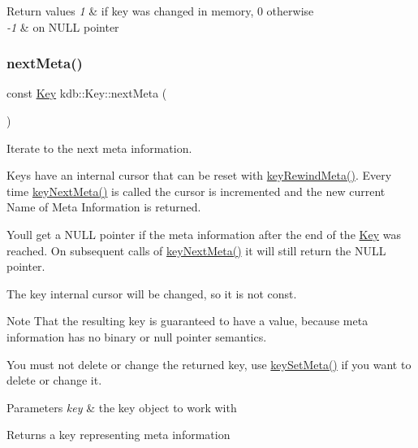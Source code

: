 \begin{DoxyRetVals}{Return values}
{\em 1} & if {\ttfamily key} was changed in memory, 0 otherwise \\
\hline
{\em -\/1} & on N\+U\+LL pointer \\
\hline
\end{DoxyRetVals}
\mbox{\label{classkdb_1_1Key_a855f37fef58a4ea4006d9e281f66cfe1}} 
\subsubsection{\texorpdfstring{nextMeta()}{nextMeta()}}
{\footnotesize\ttfamily const \mbox{\hyperlink{classkdb_1_1Key}{Key}} kdb\+::\+Key\+::next\+Meta (\begin{DoxyParamCaption}{ }\end{DoxyParamCaption})\hspace{0.3cm}{\ttfamily [inline]}}



Iterate to the next meta information. 

Keys have an internal cursor that can be reset with \mbox{\hyperlink{group__keymeta_ga5dbb669802eea27e106ee3a5e39717a9}{key\+Rewind\+Meta()}}. Every time \mbox{\hyperlink{group__keymeta_ga4c88342f580a4291455a801af71ce048}{key\+Next\+Meta()}} is called the cursor is incremented and the new current Name of Meta Information is returned.

You\textquotesingle{}ll get a N\+U\+LL pointer if the meta information after the end of the \mbox{\hyperlink{classkdb_1_1Key}{Key}} was reached. On subsequent calls of \mbox{\hyperlink{group__keymeta_ga4c88342f580a4291455a801af71ce048}{key\+Next\+Meta()}} it will still return the N\+U\+LL pointer.

The {\ttfamily key} internal cursor will be changed, so it is not const.

\begin{DoxyNote}{Note}
That the resulting key is guaranteed to have a value, because meta information has no binary or null pointer semantics.

You must not delete or change the returned key, use \mbox{\hyperlink{group__keymeta_gae1f15546b234ffb6007d8a31178652b9}{key\+Set\+Meta()}} if you want to delete or change it.
\end{DoxyNote}

\begin{DoxyParams}{Parameters}
{\em key} & the key object to work with \\
\hline
\end{DoxyParams}
\begin{DoxyReturn}{Returns}
a key representing meta information 
\end{DoxyReturn}

